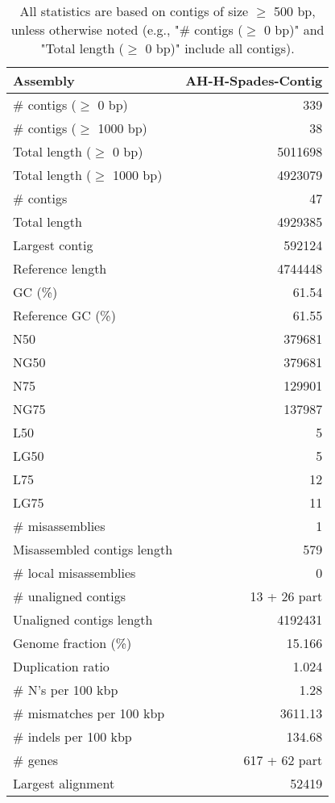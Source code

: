 \documentclass[12pt,a4paper]{article}
\begin{document}
\begin{table}[ht]
\begin{center}
\caption{All statistics are based on contigs of size $\geq$ 500 bp, unless otherwise noted (e.g., "\# contigs ($\geq$ 0 bp)" and "Total length ($\geq$ 0 bp)" include all contigs).}
\begin{tabular}{|l*{1}{|r}|}
\hline
Assembly & AH-H-Spades-Contig \\ \hline
\# contigs ($\geq$ 0 bp) & 339 \\ \hline
\# contigs ($\geq$ 1000 bp) & 38 \\ \hline
Total length ($\geq$ 0 bp) & 5011698 \\ \hline
Total length ($\geq$ 1000 bp) & 4923079 \\ \hline
\# contigs & 47 \\ \hline
Total length & 4929385 \\ \hline
Largest contig & 592124 \\ \hline
Reference length & 4744448 \\ \hline
GC (\%) & 61.54 \\ \hline
Reference GC (\%) & 61.55 \\ \hline
N50 & 379681 \\ \hline
NG50 & 379681 \\ \hline
N75 & 129901 \\ \hline
NG75 & 137987 \\ \hline
L50 & 5 \\ \hline
LG50 & 5 \\ \hline
L75 & 12 \\ \hline
LG75 & 11 \\ \hline
\# misassemblies & 1 \\ \hline
Misassembled contigs length & 579 \\ \hline
\# local misassemblies & 0 \\ \hline
\# unaligned contigs & 13 + 26 part \\ \hline
Unaligned contigs length & 4192431 \\ \hline
Genome fraction (\%) & 15.166 \\ \hline
Duplication ratio & 1.024 \\ \hline
\# N's per 100 kbp & 1.28 \\ \hline
\# mismatches per 100 kbp & 3611.13 \\ \hline
\# indels per 100 kbp & 134.68 \\ \hline
\# genes & 617 + 62 part \\ \hline
Largest alignment & 52419 \\ \hline
\end{tabular}
\end{center}
\end{table}
\end{document}

